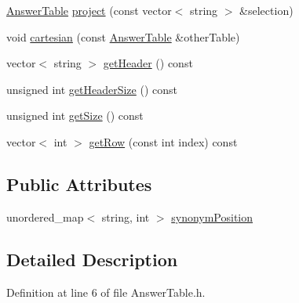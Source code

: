 \begin{DoxyCompactItemize}
\item 
\hyperlink{class_answer_table}{Answer\-Table} \hyperlink{class_answer_table_a44d359653923049566c8815d7f0616b2}{project} (const vector$<$ string $>$ \&selection)
\item 
void \hyperlink{class_answer_table_a6402136f56eccb33fd311b9c5208b884}{cartesian} (const \hyperlink{class_answer_table}{Answer\-Table} \&other\-Table)
\item 
vector$<$ string $>$ \hyperlink{class_answer_table_a7d8957160038486ced90cffc680d491c}{get\-Header} () const 
\item 
unsigned int \hyperlink{class_answer_table_a53f9b463b98d79290b6e3528d7f9e464}{get\-Header\-Size} () const 
\item 
unsigned int \hyperlink{class_answer_table_af97a334c1ffcd4b185ddf8d981ef91bf}{get\-Size} () const 
\item 
vector$<$ int $>$ \hyperlink{class_answer_table_a28df331881ed15b3012b0d717109096c}{get\-Row} (const int index) const 
\end{DoxyCompactItemize}
\subsection*{Public Attributes}
\begin{DoxyCompactItemize}
\item 
unordered\-\_\-map$<$ string, int $>$ \hyperlink{class_answer_table_a53431094ba04eb9bc510e9cc63172fb1}{synonym\-Position}
\end{DoxyCompactItemize}


\subsection{Detailed Description}


Definition at line 6 of file Answer\-Table.\-h.




